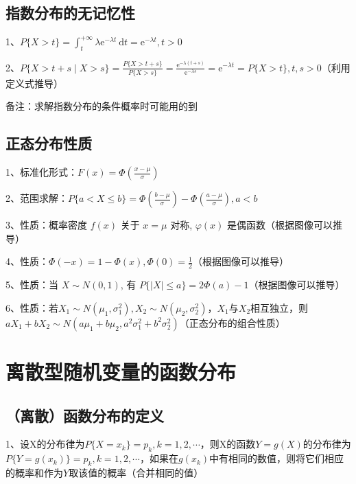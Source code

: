 \subsection{指数分布的无记忆性}

1、$P\{X>t\}=\int_{t}^{+\infty} \lambda \mathrm{e}^{-\lambda t} \mathrm{~d} t=\mathrm{e}^{-\lambda t}, t>0$

2、$P\{X>t+s \mid X>s\}=\frac{P\{X>t+s\}}{P\{X>s\}}=\frac{\mathrm{e}^{-\lambda(t+s)}}{\mathrm{e}^{-\lambda s}}=\mathrm{e}^{-\lambda t}=P\{X>t\}, t, s>0$（利用定义式推导）

备注：求解指数分布的条件概率时可能用的到



\subsection{正态分布性质}

1、标准化形式：$F(x)=\Phi\left(\frac{x-\mu}{\sigma}\right)$

2、范围求解：$P\{a<X \leqslant b\}=\Phi\left(\frac{b-\mu}{\sigma}\right)-\Phi\left(\frac{a-\mu}{\sigma}\right), a<b$

3、性质：概率密度 $f(x)$ 关于 $x=\mu$ 对称, $\varphi(x)$ 是偶函数（根据图像可以推导）

4、性质：$\Phi(-x)=1-\Phi(x), \Phi(0)=\frac{1}{2}$（根据图像可以推导）

5、性质：当 $X \sim N(0,1)$, 有 $P\{|X| \leqslant a\}=2 \Phi(a)-1$（根据图像可以推导）

6、性质：若$X_{1} \sim N\left(\mu_{1}, \sigma_{1}^{2}\right), X_{2} \sim N\left(\mu_{2}, \sigma_{2}^{2}\right)$，$X_{1}$与$X_{2}$相互独立，则$a X_{1}+b X_{2} \sim N\left(a \mu_{1}+b \mu_{2}, a^{2} \sigma_{1}^{2}+b^{2} \sigma_{2}^{2}\right)$（正态分布的组合性质）

\section{离散型随机变量的函数分布}



\subsection{（离散）函数分布的定义}

1、设X的分布律为$P\{X=x_k\}=p_k,k=1,2,\cdots$，则X的函数$Y=g(X)$的分布律为$P\{Y=g(x_k)\}=p_k,k=1,2,\cdots$，如果在$g(x_k)$中有相同的数值，则将它们相应的概率和作为$Y$取该值的概率（合并相同的值）



